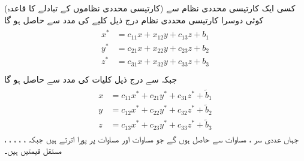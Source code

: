 \quad (کارتیسی محددی نظاموں کے تبادلے کا قاعدہ)
کسی ایک کارتیسی محددی نظام  سے کوئی دوسرا کارتیسی محددی نظام   درج ذیل کلیے کی مدد سے حاصل ہو گا
\begin{gather}
\begin{aligned}
x^*&=c_{11}x+x_{12}y+c_{13}z+b_1\\
y^*&=c_{21}x+x_{22}y+c_{23}z+b_2\\
z^*&=c_{31}x+x_{32}y+c_{33}z+b_3\\
\end{aligned}
\end{gather}
جبکہ  سے  درج ذیل کلیات کی مدد سے حاصل ہو گا
\begin{gather}
\begin{aligned}
x&=c_{11}x^*+c_{21}y^*+c_{31}z^*+\tilde{b}_1\\
y&=c_{12}x^*+c_{22}y^*+c_{32}z^*+\tilde{b}_2\\
z&=c_{13}x^*+c_{23}y^*+c_{33}z^*+\tilde{b}_3
\end{aligned}
\end{gather}
جہاں عددی سر ،  مساوات  سے حاصل ہوں گے جو مساوات  اور مساوات  پر پورا اترتے ہیں جبکہ ، ، ، ، ،  مستقل قیمتیں ہیں۔


